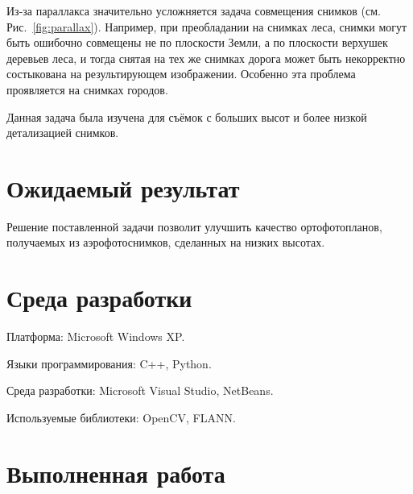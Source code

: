 \documentclass[a4paper,12pt]{article}
\begin{document}
Из-за параллакса значительно усложняется задача совмещения снимков (см. Рис.~\ref{fig:parallax}). 
Например, при преобладании на снимках леса,
снимки могут быть ошибочно совмещены не по плоскости Земли, 
а по плоскости верхушек деревьев леса, и
тогда снятая на тех же снимках дорога может быть некорректно состыкована на
результирующем изображении.
Особенно эта проблема проявляется на снимках городов.

Данная задача была изучена для съёмок с больших высот и более низкой 
детализацией снимков.

\section{Ожидаемый результат}
Решение поставленной задачи позволит улучшить качество ортофотопланов, 
получаемых из аэрофотоснимков, сделанных на низких высотах. 

\section{Среда разработки}

Платформа: Microsoft Windows XP.

Языки программирования: C++, Python.

Среда разработки: Microsoft Visual Studio, NetBeans.

Используемые библиотеки: OpenCV, FLANN. %

\section{Выполненная работа}

% 
% 
%    
% 
% 
% 
\end{document}
